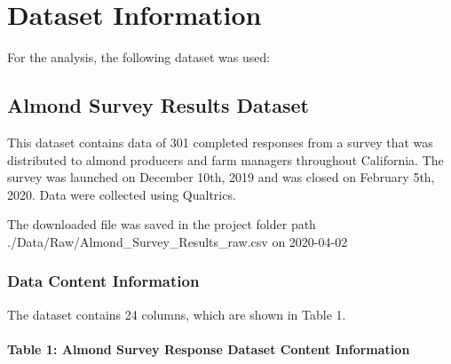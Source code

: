 \documentclass[12pt,]{article}
\let\oldparagraph\paragraph
\renewcommand{\paragraph}[1]{\oldparagraph{#1}\mbox{}}
\begin{document}
\newpage

\section{Dataset Information}\label{dataset-information}

For the analysis, the following dataset was used:

\subsection{Almond Survey Results
Dataset}\label{almond-survey-results-dataset}

This dataset contains data of 301 completed responses from a survey that
was distributed to almond producers and farm managers throughout
California. The survey was launched on December 10th, 2019 and was
closed on February 5th, 2020. Data were collected using Qualtrics.

The downloaded file was saved in the project folder path
./Data/Raw/Almond\_Survey\_Results\_raw.csv on 2020-04-02

\subsubsection{Data Content Information}\label{data-content-information}

The dataset contains 24 columns, which are shown in Table 1.

\paragraph{Table 1: Almond Survey Response Dataset Content
Information}\label{table-1-almond-survey-response-dataset-content-information}
\end{document}
